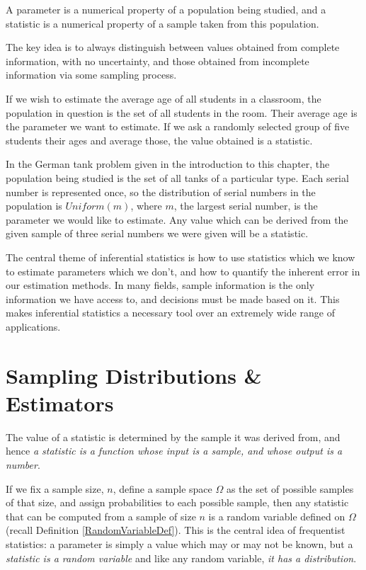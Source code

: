 \begin{definition}
A parameter is a numerical property of a population being studied, and a statistic is a numerical property of a sample taken from this population.
\end{definition}
\par
The key idea is to always distinguish between values obtained from complete information, with no uncertainty, and those obtained from incomplete information via some sampling process.
\begin{examp}\label{ClassAge}
If we wish to estimate the average age of all students in a classroom, the population in question is the set of all students in the room. Their average age is the parameter we want to estimate. If we ask a randomly selected group of five students their ages and average those, the value obtained is a statistic.
\end{examp}
\begin{examp}
In the German tank problem given in the introduction to this chapter, the population being studied is the set of all tanks of a particular type. Each serial number is represented once, so the distribution of serial numbers in the population is $Uniform(m)$, where $m$, the largest serial number, is the parameter we would like to estimate. Any value which can be derived from the given sample of three serial numbers we were given will be a statistic.
\end{examp}
\par
The central theme of inferential statistics is how to use statistics which we know to estimate parameters which we don't, and how to quantify the inherent error in our estimation methods. In many fields, sample information is the only information we have access to, and decisions must be made based on it. This makes inferential statistics a necessary tool over an extremely wide range of applications.


\section{Sampling Distributions \& Estimators}

The value of a statistic is determined by the sample it was derived from, and hence \emph{a statistic is a function whose input is a sample, and whose output is a number}.
\par
If we fix a sample size, $n$, define a sample space $\Omega$ as the set of possible samples of that size, and assign probabilities to each possible sample, then any statistic that can be computed from a sample of size $n$ is a random variable defined on $\Omega$ (recall Definition \ref{RandomVariableDef}). This is the central idea of frequentist statistics: a parameter is simply a value which may or may not be known, but a \emph{statistic is a random variable} and like any random variable, \emph{it has a distribution}.

